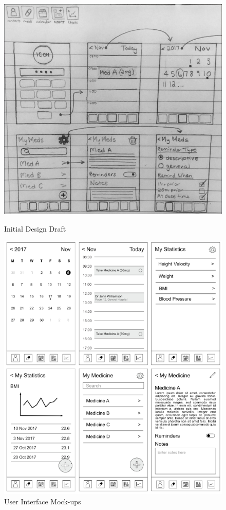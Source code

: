 \documentclass{l3proj}
\begin{document}
\begin{figure}[ht]
  \centering
  \begin{minipage}[b]{0.48\textwidth}
    \includegraphics[width=\textwidth]{figures/initial_wireframes.png}
    \caption{Initial Design Draft}
    \label{fig:initial_wireframes}
  \end{minipage}
  \hfill
  \begin{minipage}[b]{0.48\textwidth}
    \includegraphics[width=\textwidth]{figures/final_wireframes.png}
    \caption{User Interface Mock-ups}
    \label{fig:final_wireframes}
  \end{minipage}
\end{figure}
\end{document}
